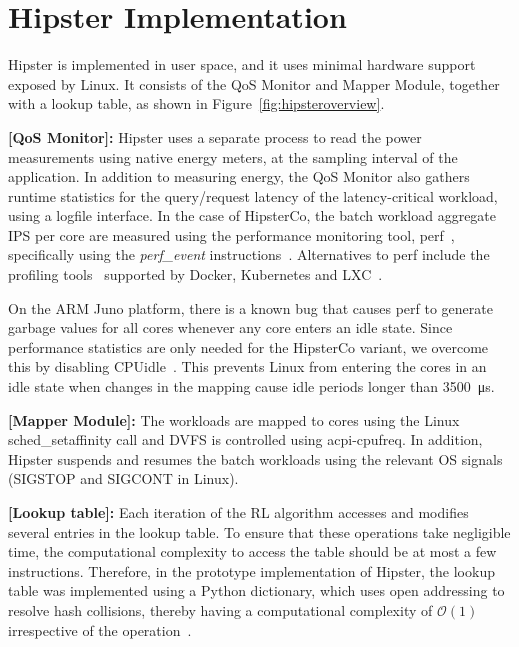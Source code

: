 \section{Hipster Implementation}
\label{sec: implementation}

Hipster is implemented in user space, and it uses minimal hardware support exposed by Linux. It consists of the QoS Monitor and Mapper Module, together with a lookup table, as shown in Figure~\ref{fig:hipsteroverview}. 

 \textbf{[QoS Monitor]:} Hipster uses a separate process to read the power measurements using native energy meters, at the sampling interval of the application. In addition to measuring energy, the QoS Monitor also gathers runtime statistics for the query/request latency of the latency-critical workload, using a logfile interface. In the case of HipsterCo, the  batch workload aggregate IPS per core are measured using the performance monitoring tool,
\textsf{perf}~\citep{2016Perf:Counters}, specifically using the \textit{perf\_event} \textsf{instructions}~\citep{ARMLimitedARMManual,ARMLimitedARMManualb}. Alternatives to \textsf{perf} include the profiling tools~\citep{Ren2010Google-WideCenters} supported by Docker, Kubernetes and LXC~\citep{Bernstein2014ContainersKubernetes}.  


On the ARM Juno platform, there is a known bug that causes \textsf{perf} to generate garbage values for all cores whenever any core enters an idle state. Since performance statistics are only needed for the HipsterCo variant, we overcome this by disabling CPUidle~\citep{ARMLimitedARMManual,ARMLimitedARMManualb}. This prevents Linux from entering the cores in an idle state when changes in the mapping cause idle periods longer than \SI{3500}{\micro\second}.

\textbf{[Mapper Module]:} The workloads are mapped to cores using the Linux \textsf{sched\_setaffinity} call and DVFS is controlled using \textsf{acpi-cpufreq}. In addition, Hipster suspends and resumes the batch workloads using the relevant OS signals ({\small \textsf{SIGSTOP}} and {\small \textsf{SIGCONT}} in Linux).

\textbf{[Lookup table]:} Each iteration of the RL algorithm accesses and modifies several entries in the lookup table. To ensure that these operations take negligible time, the computational complexity to access the table should be at most a few instructions. Therefore, in the prototype implementation of Hipster, the lookup table was implemented using a Python dictionary, which uses open addressing to resolve hash collisions, thereby having a computational complexity of $\mathcal{O}(1)$ irrespective of the operation~\citep{PattisComplexityHttps://www.ics.uci.edu/pattis/ICS-33/lectures/complexitypython.txt}.

